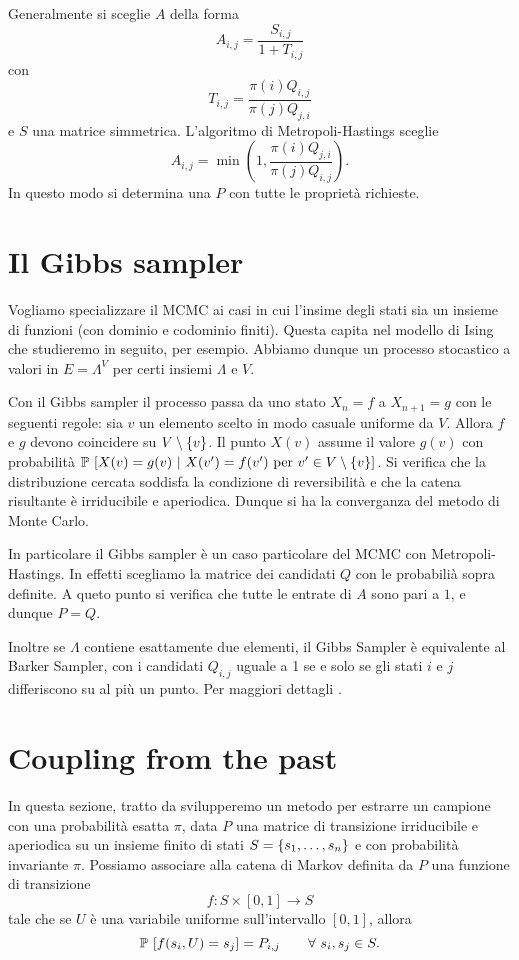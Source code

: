 \documentclass[]{marticle}
\begin{document}
Generalmente si sceglie $A$ della forma
\[
    A_{i,j} = \frac{S_{i,j}}{1+T_{i,j}}
\]
con
\[
    T_{i, j} = \frac{\pi(i) Q_{i,j}}{\pi(j) Q_{j,i}}
\]
e $S$ una matrice simmetrica.
L'algoritmo di Metropoli-Hastings sceglie
\[
    A_{i,j} = \min \left(1, \frac{\pi(i)Q_{j,i}}{\pi(j)Q_{i,j}}\right).
\]
 In questo modo si determina una $P$ con tutte le propriet\`a richieste.

\section{Il Gibbs sampler}

Vogliamo specializzare il MCMC ai casi in cui l'insime degli stati sia un
insieme di funzioni (con dominio e codominio finiti). Questa capita nel modello
di Ising che studieremo in seguito, per esempio. Abbiamo dunque un processo
stocastico a valori in $E=\Lambda^V$ per certi insiemi $\Lambda$ e $V$. 

Con il Gibbs sampler il processo passa da uno stato $X_n=f$ a $X_{n+1}=g$ con le
seguenti regole: sia $v$ un elemento scelto in modo casuale uniforme da $V$.
Allora $f$ e $g$ devono coincidere su $V\setminus\{v\}$. Il punto $X(v)$
assume il valore $g(v)$ con probabilit\`a $\prob{X(v)=g(v) \ |\ X(v')=f(v')
\text{ per } v' \in V\setminus\setof{v}}$. Si verifica che la distribuzione
cercata soddisfa la condizione di reversibilit\`a e che la catena risultante \`e
irriducibile e aperiodica. Dunque si ha la converganza del metodo di Monte
Carlo.

In particolare il Gibbs sampler \`e un caso particolare del MCMC con
Metropoli-Hastings. In effetti scegliamo la matrice dei candidati $Q$ con le
probabili\`a sopra definite. A queto punto si verifica che tutte le entrate di
$A$ sono pari a $1$, e dunque $P=Q$.

Inoltre se $\Lambda$ contiene esattamente due elementi, il Gibbs Sampler \`e
equivalente al Barker Sampler, con i candidati $Q_{i,j}$ uguale a 1 se e solo se
gli stati $i$ e $j$ differiscono su al pi\`u un punto. Per maggiori dettagli
\cite{bremaud}.

\section{Coupling from the past}

In questa sezione, tratto da \cite{haggstrom} svilupperemo un metodo per
estrarre un campione con una probabilit\`a esatta $\pi$, data $P$ una matrice di
transizione irriducibile e aperiodica su un insieme finito di stati
$S=\{s_1,\dots,s_n\}$ e con probabilit\`a invariante $\pi$. Possiamo
associare alla catena di Markov definita da $P$ una funzione di transizione 
\[
    f\colon S\times [0,1] \longrightarrow S
\]
tale che se $U$ \`e una variabile uniforme sull'intervallo $[0,1]$, allora 
\[
    \prob{f(s_i,U)=s_j}=P_{i,j} \qquad \forall s_i,s_j \in S.
\]
\end{document}
